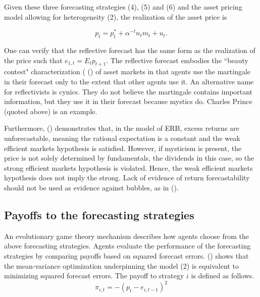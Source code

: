 \documentclass[12pt]{article}
\begin{document}
Given these three forecasting strategies (4), (5) and (6) and the asset pricing model allowing for heterogeneity (2), the realization of the asset price is

\begin{equation}
p_{t}=p_{t}^{*}+\alpha^{-t} n_{t} m_{t}+u_{t} . \label{p}
\end{equation}

One can verify that the reflective forecast has the same form as the realization of the price such that $e_{1, t}=E_{t} p_{t+1}$. The reflective forecast embodies the ``beauty contest" characterization (\citeauthor{keynes1935general} (\citeyear{keynes1935general}) of asset markets in that agents use the martingale in their forecast only to the extent that other agents use it. An alternative name for reflectivists is cynics. They do not believe the martingale contains important information, but they use it in their forecast because mystics do. Charles Prince (quoted above) is an example.

Furthermore, \citeauthor{Waters2018} (\citeyear{Waters2018}) demonstrates that, in the model of ERB, excess returns are unforecastable, meaning the rational expectation is a constant and the weak efficient markets hypothesis is satisfied. However, if mysticism is present, the price is not solely determined by fundamentals, the dividends in this case, so the strong efficient markets hypothesis is violated. Hence, the weak efficient markets hypothesis does not imply the strong. Lack of evidence of return forecastability should not be used as evidence against bubbles, as in \citeauthor{cochrane2008dog} (\citeyear{cochrane2008dog}). 

\subsection{Payoffs to the forecasting strategies}

An evolutionary game theory mechanism describes how agents choose from the above forecasting strategies. Agents evaluate the performance of the forecasting strategies by comparing payoffs based on squared forecast errors. \citeauthor{hommes2001financial} (\citeyear{hommes2001financial}) shows that the mean-variance optimization underpinning the model (2) is equivalent to minimizing squared forecast errors. The payoff to strategy $i$ is defined as follows.
\begin{equation*}
\pi_{i, t}=-\left(p_{t}-e_{i, t-1}\right)^{2}
\end{equation*}
\end{document}
